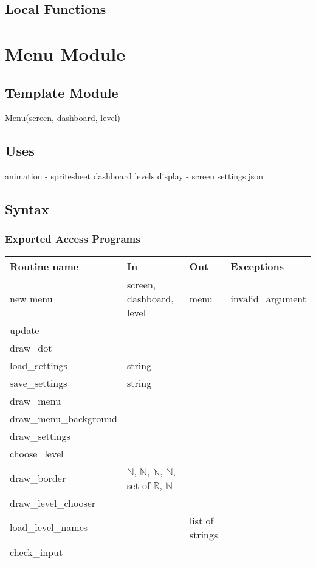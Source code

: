 \documentclass[12pt]{article}
\begin{document}
\subsection*{Local Functions}

\newpage

\section {Menu Module}

\subsection{Template Module}

Menu(screen, dashboard, level)

\subsection {Uses}

animation - spritesheet
dashboard
levels
display - screen
settings.json

\subsection {Syntax}

\subsubsection {Exported Access Programs}

\begin{tabular}{| l | l | l | l |}
\hline
\textbf{Routine name} & \textbf{In} & \textbf{Out} & \textbf{Exceptions}\\
\hline
new menu & screen, dashboard, level & menu & invalid\_argument\\
\hline
update & & & \\
\hline
draw\_dot & & & \\
\hline
load\_settings & string & & \\
\hline
save\_settings & string & & \\
\hline
draw\_menu & & & \\
\hline
draw\_menu\_background & & & \\
\hline
draw\_settings & & & \\
\hline
choose\_level & & & \\
\hline
draw\_border & $\mathbb{N}$, $\mathbb{N}$, $\mathbb{N}$, $\mathbb{N}$, set of $\mathbb{R}$, $\mathbb{N}$ & & \\
\hline
draw\_level\_chooser & & & \\
\hline
load\_level\_names & & list of strings & \\
\hline
check\_input & & & \\
\hline
\end{tabular}
\end{document}
